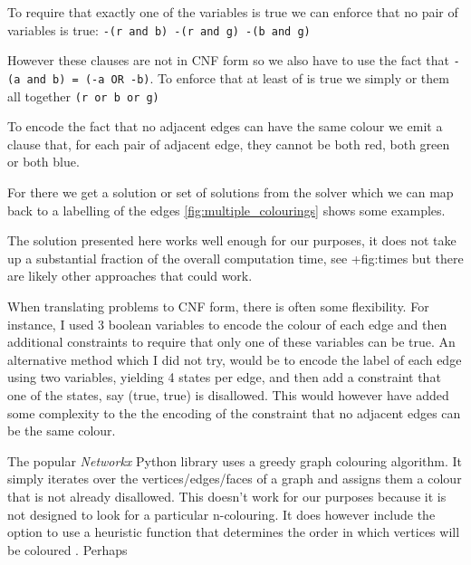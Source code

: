 To require that exactly one of the variables is true we can enforce that no pair of variables is true: \texttt{-(r\ and\ b)\ -(r\ and\ g)\ -(b\ and\ g)}

However these clauses are not in CNF form so we also have to use the fact that \texttt{-(a\ and\ b)\ =\ (-a\ OR\ -b)}. To enforce that at least of is true we simply or them all together \texttt{(r\ or\ b\ or\ g)}

To encode the fact that no adjacent edges can have the same colour we emit a clause that, for each pair of adjacent edge, they cannot be both red, both green or both blue.

For there we get a solution or set of solutions from the solver which we can map back to a labelling of the edges \cref{fig:multiple_colourings} shows some examples.

The solution presented here works well enough for our purposes, it does not take up a substantial fraction of the overall computation time, see +fig:times but there are likely other approaches that could work.

When translating problems to CNF form, there is often some flexibility. For instance, I used 3 boolean variables to encode the colour of each edge and then additional constraints to require that only one of these variables can be true. An alternative method which I did not try, would be to encode the label of each edge using two variables, yielding 4 states per edge, and then add a constraint that one of the states, say (true, true) is disallowed. This would however have added some complexity to the the encoding of the constraint that no adjacent edges can be the same colour.

The popular \emph{Networkx} Python library uses a greedy graph colouring algorithm. It simply iterates over the vertices/edges/faces of a graph and assigns them a colour that is not already disallowed. This doesn't work for our purposes because it is not designed to look for a particular n-colouring. It does however include the option to use a heuristic function that determines the order in which vertices will be coloured \autocite{kosowski2004classical,matulaSmallestlastOrderingClustering1983}. Perhaps

